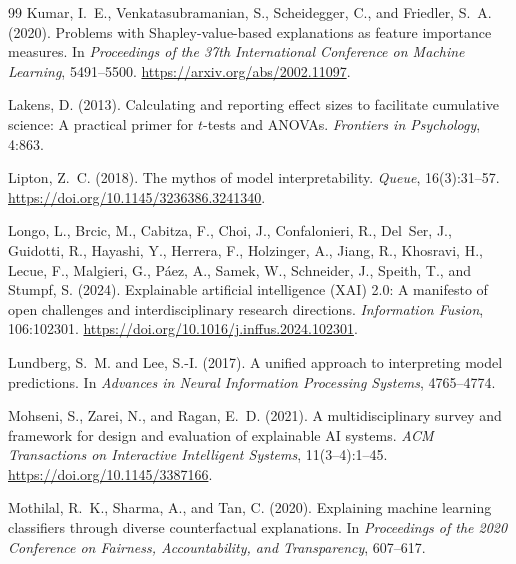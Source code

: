 \documentclass[twoside,11pt]{article}
\begin{document}
\begin{thebibliography}{99}
Kumar, I.~E., Venkatasubramanian, S., Scheidegger, C., and
Friedler, S.~A. (2020).
Problems with {Shapley}-value-based explanations as feature importance
measures.
In \emph{Proceedings of the 37th International Conference on Machine
Learning}, 5491--5500.
\url{https://arxiv.org/abs/2002.11097}.

Lakens, D. (2013).
Calculating and reporting effect sizes to facilitate cumulative science:
A practical primer for $t$-tests and ANOVAs.
\emph{Frontiers in Psychology}, 4:863.

Lipton, Z.~C. (2018).
The mythos of model interpretability.
\emph{Queue}, 16(3):31--57.
\url{https://doi.org/10.1145/3236386.3241340}.

Longo, L., Brcic, M., Cabitza, F., Choi, J., Confalonieri, R., Del~Ser, J.,
Guidotti, R., Hayashi, Y., Herrera, F., Holzinger, A., Jiang, R.,
Khosravi, H., Lecue, F., Malgieri, G., P\'{a}ez, A., Samek, W.,
Schneider, J., Speith, T., and Stumpf, S. (2024).
Explainable artificial intelligence (XAI) 2.0: A manifesto of open
challenges and interdisciplinary research directions.
\emph{Information Fusion}, 106:102301.
\url{https://doi.org/10.1016/j.inffus.2024.102301}.

Lundberg, S.~M. and Lee, S.-I. (2017).
A unified approach to interpreting model predictions.
In \emph{Advances in Neural Information Processing Systems}, 4765--4774.

Mohseni, S., Zarei, N., and Ragan, E.~D. (2021).
A multidisciplinary survey and framework for design and evaluation of
explainable {AI} systems.
\emph{{ACM} Transactions on Interactive Intelligent Systems},
11(3--4):1--45.
\url{https://doi.org/10.1145/3387166}.

Mothilal, R.~K., Sharma, A., and Tan, C. (2020).
Explaining machine learning classifiers through diverse counterfactual
explanations.
In \emph{Proceedings of the 2020 Conference on Fairness, Accountability,
and Transparency}, 607--617.


\end{thebibliography}
\end{document}
